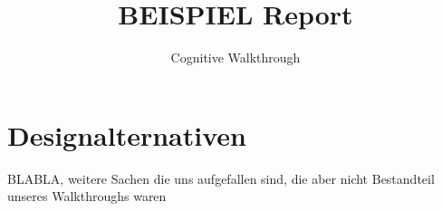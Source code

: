 \documentclass[fontsize=12pt,a4paper]{scrartcl}
\begin{document}
\titlehead{
\texttt{[image: figures/uni-wb-hci-header]}
}

\subject{Wintersemester 2014/2015\\ Einführung in die Mensch-Computer-Interaktion}

\title{BEISPIEL Report}

\subtitle{Cognitive Walkthrough}

\publishers{
Benedikt Pfaff, Matrikelnummer 2060170\\
Armin Beutel, Matrikelnummer 1790705\\
Johannes Grohmann, Matrikelnummer 1808010
Thomas Handwerker, Matrikelnummer 1995289\\
Alexander Werthmann, Matrikelnummer 1234567\\[3em] 
\normalsize Supervisors: Chris Zimmerer, Kristof Korwisi}

\maketitle

\setcounter{page}{0}
\thispagestyle{empty}

\newpage

\setcounter{page}{1}


\tableofcontents

\newpage

\setcounter{page}{1}

{}

{}

{}
{}
{}
{}
{}
{}

{}


%

\newpage
\appendix

\section{Designalternativen}
BLABLA, weitere Sachen die uns aufgefallen sind, die aber nicht Bestandteil unseres Walkthroughs waren
\end{document}

